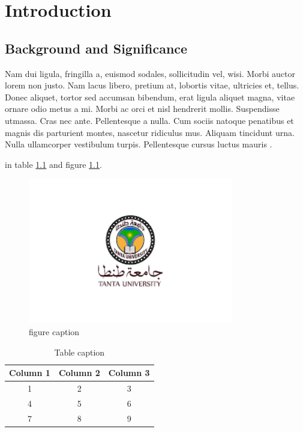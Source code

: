 \chapter{Introduction} \label{chapter1}

\thispagestyle{empty}

\section{Background and Significance}

Nam dui ligula, fringilla a, euismod sodales, sollicitudin vel, wisi. Morbi auctor lorem non justo. Nam lacus libero, pretium at, lobortis vitae, ultricies et, tellus. Donec aliquet, tortor sed accumsan bibendum, erat ligula aliquet magna, vitae ornare odio metus a mi. Morbi ac orci et nisl hendrerit mollis. Suspendisse utmassa. Cras nec ante. Pellentesque a nulla. Cum sociis natoque penatibus et magnis dis parturient montes, nascetur ridiculus mus. Aliquam tincidunt urna. Nulla ullamcorper vestibulum turpis. Pellentesque cursus luctus mauris \cite{Elkholy2018}.


in table \ref{tab:table_caption} and figure \ref{fig:fig_caption}.


\begin{figure}[h!]
    \centering
    \includegraphics[width=0.8\textwidth]{figs/image.png}
    \caption{figure caption}
    \label{fig:fig_caption}
\end{figure}

\begin{table}
    \centering
    \caption{Table caption}
    \label{tab:table_caption}
    \begin{tabular}{ccc}
        \hline
        \textbf{Column 1} & \textbf{Column 2} & \textbf{Column 3} \\
        \hline
        \hline
        1 & 2 & 3 \\
        4 & 5 & 6 \\
        7 & 8 & 9 \\
        \hline
    \end{tabular}
\end{table}


